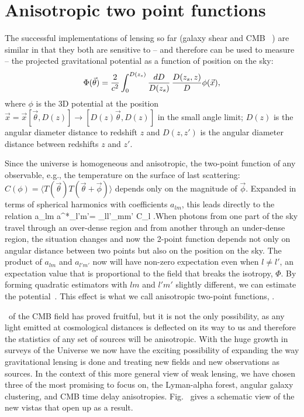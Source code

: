 \section{Anisotropic two point functions}

The successful implementations of lensing so far (galaxy shear
and CMB \atf\ ) are similar in that 
they both are sensitive to -- and therefore 
can be used to measure -- the projected gravitational potential as a function 
of position on the sky:
\begin{equation}
\Phi(\vec\theta)=\frac{2}{c^2}\int^{D(z_{s})}_{0}\frac{dD}{D(z_s)}\,\frac{D(z_{s},z)}{D}\phi(\vec
x),\eql{phi}
\end{equation}
where $\phi$ is the 3D potential at the position $\vec x=\vec
x[\vec\theta,D(z)]\rightarrow [D(z)\vec\theta,D(z)]$ in the small
angle limit; $D(z)$ is the angular diameter distance to redshift $z$
and $D(z,z')$ is the angular diameter distance between redshifts $z$
and $z'$.


Since the universe is homogeneous and
anisotropic, the two-point function of any observable, e.g., the
temperature on the surface of last scattering: $C(\phi)=\langle T(\vec
\theta)T(\vec\theta+\vec{\phi})\rangle$ depends only on the magnitude
of $\vec\phi$. Expanded in terms of spherical harmonics with
coefficients $a_{lm}$, this leads directly to the relation
\be \langle a_{lm} a^*_{l'm'}\rangle = \delta_{ll'}\delta_{mm'} C_l
.\ee When photons from one part of the sky travel through an
over-dense region and from another through an under-dense region, the
situation changes and now the 2-point function depends not only on
angular distance between two points but also on the position on the
sky. The product of $a_{lm}$ and $a_{l'm'}$ now will have non-zero
expectation even when $l\ne l'$, an expectation value that is
proportional to the field that breaks the isotropy, $\Phi$. By forming
quadratic estimators with $lm$ and $l'm'$ slightly different, we can
estimate the potential~\citep{Hu:2001tn,okamoto}.  This effect 
is what we call anisotropic two-point
 functions, \atf.
 
\atf\ of the CMB field has proved fruitful, but it is not the only
possibility, as any light emitted at cosmological distances is
deflected on its way to us and therefore the statistics of any set of
sources will be anisotropic. With the huge growth in surveys of the
Universe we now have the exciting possibility of expanding the way
gravitational lensing is done and treating new fields and new
observations as sources. In the context of this more general view of
weak lensing, we have chosen three of the most promising  to
focus on, the Lyman-alpha forest, angular galaxy
clustering, and CMB time delay anisotropies. Fig.~ gives a 
schematic view of the new vistas that open up as a result.

